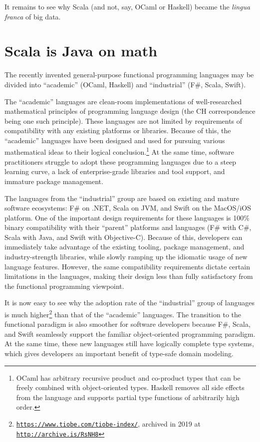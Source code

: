 It remains to see why Scala (and not, say, OCaml or Haskell) became
the \emph{lingua franca} of big data.

\section{Scala is Java on math }

The recently invented general-purpose functional programming languages
may be divided into \textsf{``}academic\textsf{''} (OCaml, Haskell) and \textsf{``}industrial\textsf{''}
(F\#, Scala, Swift).

The \textsf{``}academic\textsf{''} languages are clean-room implementations of well-researched
mathematical principles of programming language design (the CH correspondence
being one such principle). These languages are not limited by requirements
of compatibility with any existing platforms or libraries. Because
of this, the \textsf{``}academic\textsf{''} languages have been designed and used
for pursuing various mathematical ideas to their logical conclusion.\footnote{OCaml has arbitrary recursive product and co-product types that can
be freely combined with object-oriented types. Haskell removes all
side effects from the language and supports partial type functions
of arbitrarily high order.} At the same time, software practitioners struggle to adopt these
programming languages due to a steep learning curve, a lack of enterprise-grade
libraries and tool support, and immature package management.

The languages from the \textsf{``}industrial\textsf{''} group are based on existing
and mature software ecosystems: F\# on .NET, Scala on JVM, and Swift
on the MacOS/iOS platform. One of the important design requirements
for these languages is 100\% binary compatibility with their \textsf{``}parent\textsf{''}
platforms and languages (F\# with C\#, Scala with Java, and Swift
with Objective-C). Because of this, developers can immediately take
advantage of the existing tooling, package management, and industry-strength
libraries, while slowly ramping up the idiomatic usage of new language
features. However, the same compatibility requirements dictate certain
limitations in the languages, making their design less than fully
satisfactory from the functional programming viewpoint.

It is now easy to see why the adoption rate of the \textsf{``}industrial\textsf{''}
group of languages is much higher\footnote{\texttt{\href{https://www.tiobe.com/tiobe-index/}{https://www.tiobe.com/tiobe-index/}},
archived in 2019 at \texttt{\href{http://archive.is/RsNH8}{http://archive.is/RsNH8}}} than that of the \textsf{``}academic\textsf{''} languages. The transition to the
functional paradigm is also smoother for software developers because
F\#, Scala, and Swift seamlessly support the familiar object-oriented
programming paradigm. At the same time, these new languages still
have logically complete type systems, which gives developers an important
benefit of type-safe domain modeling.

